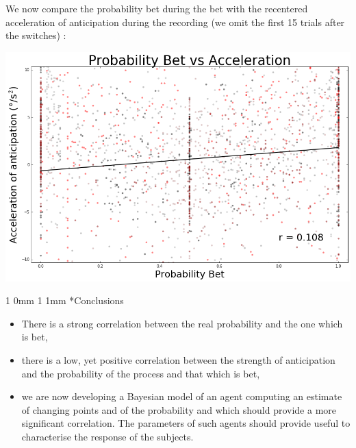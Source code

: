 \documentclass[profile,final,english, draft]{sciposter}%
\makeatletter
\renewcommand{\section}{\@startsection
        {section}%
        {1}%
        {0mm}%
        {1\baselineskip}%
        {1mm}%
        {\LARGE\color{red}\bfseries}}%
\makeatother
\begin{document}
\begin{multicols}{3}
We now compare the probability bet during the bet with the recentered acceleration of anticipation during the recording (we omit the first 15 trials after the switches) :



\begin{center} 
    \includegraphics[width=1\columnwidth]{p_parie--v_a_15_mean}
\end{center}

\section*{Conclusions}


\begin{itemize}\setlength{\itemsep}{0ex}
\item There is a strong correlation between the real probability and the one which is bet,

\item there is a low, yet positive correlation between the strength of anticipation and the probability of the process and that which is bet,

\item we are now developing a Bayesian model of an agent computing an estimate of changing points and of the probability and which should provide a more significant correlation. The parameters of such agents should provide useful to characterise the response of the subjects.

\end{itemize}

{\small
\printbibliography
}


\end{multicols}


\end{document}

